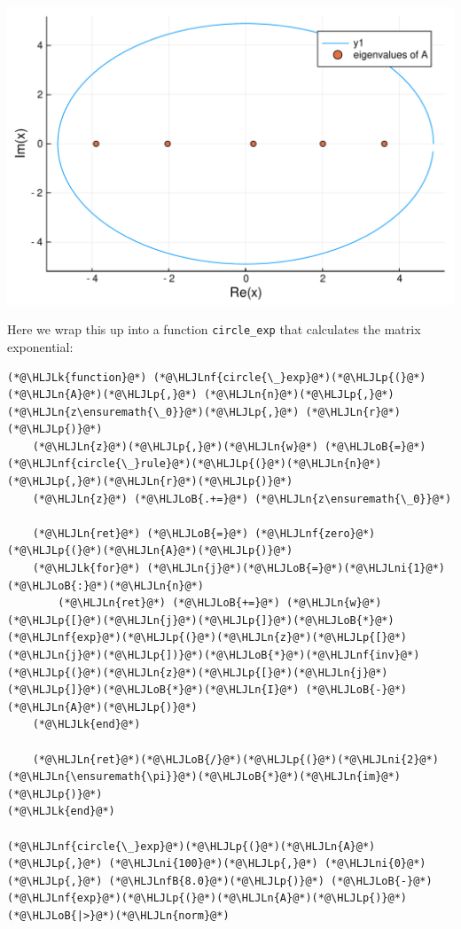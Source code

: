 \documentclass[12pt,a4paper]{article}
\newcommand{\HLJLk}[1]{\textcolor[RGB]{148,91,176}{\textbf{#1}}}
\newcommand{\HLJLn}[1]{#1}
\newcommand{\HLJLnf}[1]{\textcolor[RGB]{66,102,213}{#1}}
\newcommand{\HLJLnfB}[1]{\textcolor[RGB]{59,151,46}{#1}}
\newcommand{\HLJLni}[1]{\textcolor[RGB]{59,151,46}{#1}}
\newcommand{\HLJLoB}[1]{\textcolor[RGB]{102,102,102}{\textbf{#1}}}
\newcommand{\HLJLp}[1]{#1}
\begin{document}
\includegraphics[width=\linewidth]{figures/Lecture9_2_1.pdf}

Here we wrap this up into a function \texttt{circle\_exp} that calculates the matrix exponential:


\begin{lstlisting}
(*@\HLJLk{function}@*) (*@\HLJLnf{circle{\_}exp}@*)(*@\HLJLp{(}@*)(*@\HLJLn{A}@*)(*@\HLJLp{,}@*) (*@\HLJLn{n}@*)(*@\HLJLp{,}@*) (*@\HLJLn{z\ensuremath{\_0}}@*)(*@\HLJLp{,}@*) (*@\HLJLn{r}@*)(*@\HLJLp{)}@*)
    (*@\HLJLn{z}@*)(*@\HLJLp{,}@*)(*@\HLJLn{w}@*) (*@\HLJLoB{=}@*) (*@\HLJLnf{circle{\_}rule}@*)(*@\HLJLp{(}@*)(*@\HLJLn{n}@*)(*@\HLJLp{,}@*)(*@\HLJLn{r}@*)(*@\HLJLp{)}@*)
    (*@\HLJLn{z}@*) (*@\HLJLoB{.+=}@*) (*@\HLJLn{z\ensuremath{\_0}}@*)

    (*@\HLJLn{ret}@*) (*@\HLJLoB{=}@*) (*@\HLJLnf{zero}@*)(*@\HLJLp{(}@*)(*@\HLJLn{A}@*)(*@\HLJLp{)}@*)
    (*@\HLJLk{for}@*) (*@\HLJLn{j}@*)(*@\HLJLoB{=}@*)(*@\HLJLni{1}@*)(*@\HLJLoB{:}@*)(*@\HLJLn{n}@*)
        (*@\HLJLn{ret}@*) (*@\HLJLoB{+=}@*) (*@\HLJLn{w}@*)(*@\HLJLp{[}@*)(*@\HLJLn{j}@*)(*@\HLJLp{]}@*)(*@\HLJLoB{*}@*)(*@\HLJLnf{exp}@*)(*@\HLJLp{(}@*)(*@\HLJLn{z}@*)(*@\HLJLp{[}@*)(*@\HLJLn{j}@*)(*@\HLJLp{])}@*)(*@\HLJLoB{*}@*)(*@\HLJLnf{inv}@*)(*@\HLJLp{(}@*)(*@\HLJLn{z}@*)(*@\HLJLp{[}@*)(*@\HLJLn{j}@*)(*@\HLJLp{]}@*)(*@\HLJLoB{*}@*)(*@\HLJLn{I}@*) (*@\HLJLoB{-}@*) (*@\HLJLn{A}@*)(*@\HLJLp{)}@*)
    (*@\HLJLk{end}@*)

    (*@\HLJLn{ret}@*)(*@\HLJLoB{/}@*)(*@\HLJLp{(}@*)(*@\HLJLni{2}@*)(*@\HLJLn{\ensuremath{\pi}}@*)(*@\HLJLoB{*}@*)(*@\HLJLn{im}@*)(*@\HLJLp{)}@*)
(*@\HLJLk{end}@*)
   
(*@\HLJLnf{circle{\_}exp}@*)(*@\HLJLp{(}@*)(*@\HLJLn{A}@*)(*@\HLJLp{,}@*) (*@\HLJLni{100}@*)(*@\HLJLp{,}@*) (*@\HLJLni{0}@*)(*@\HLJLp{,}@*) (*@\HLJLnfB{8.0}@*)(*@\HLJLp{)}@*) (*@\HLJLoB{-}@*)(*@\HLJLnf{exp}@*)(*@\HLJLp{(}@*)(*@\HLJLn{A}@*)(*@\HLJLp{)}@*) (*@\HLJLoB{|>}@*)(*@\HLJLn{norm}@*)
\end{lstlisting}
\end{document}

